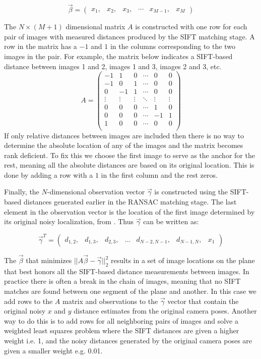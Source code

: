 \documentclass[]{spie}  %
\begin{document}
\[\vec{\beta} =
\begin{pmatrix}
  x_1, & x_2, & x_3, & \cdots & x_{M-1}, & x_M
\end{pmatrix}
\]

The $N \times (M+1)$ dimensional matrix $A$ is constructed with one
row for each pair of images with measured distances produced by the
SIFT matching stage. A row in the matrix has a $-1$ and $1$ in the
columns corresponding to the two images in the pair. For example, the
matrix below indicates a SIFT-based distance between images 1 and 2,
images 1 and 3, images 2 and 3, etc.
\[
A =
\begin{pmatrix}
  -1 & 1 & 0 & \cdots & 0 & 0\\
  -1 & 0 & 1 & \cdots & 0 & 0\\
  0 & -1 & 1 & \cdots & 0 & 0\\
  \vdots  & \vdots & \vdots & \ddots & \vdots  & \vdots\\
  0 & 0 & 0 & \cdots & 1 & 0 \\
  0 & 0 & 0 & \cdots & -1 & 1 \\
  1 & 0 & 0 & \cdots & 0 & 0 \\
\end{pmatrix}
\]
If only relative distances between images are included then there is
no way to determine the absolute location of any of the images and the
matrix becomes rank deficient. To fix this we choose the first image
to serve as the anchor for the rest, meaning all the absolute
distances are based on its original location. This is done by adding a
row with a $1$ in the first column and the rest zeros.

Finally, the $N$-dimensional observation vector $\vec{\gamma}$ is
constructed using the SIFT-based distances generated earlier in the
RANSAC matching stage. The last element in the observation vector is
the location of the first image determined by its original noisy
localization, from \cite{chen2010indoor, liu2010indoor}. Thus
$\vec{\gamma}$ can be written as:

\[
\vec{\gamma}^T =
\begin{pmatrix}
  d_{1,2}, &d_{1,3}, &d_{2,3}, &\hdots &d_{N-2,N-1}, &d_{N-1,N}, &x_1
\end{pmatrix}
\]

The $\vec{\beta}$ that minimizes $||A \vec{\beta} -
\vec{\gamma}||_2^2$ results in a set of image locations on the plane
that best honors all the SIFT-based distance measurements between
images. In practice there is often a break in the chain of images,
meaning that no SIFT matches are found between one segment of the
plane and another. In this case we add rows to the $A$ matrix and
observations to the $\vec{\gamma}$ vector that contain the original
noisy $x$ and $y$ distance estimates from the original camera
poses. Another way to do this is to add rows for all neighboring pairs
of images and solve a weighted least squares problem where the SIFT
distances are given a higher weight i.e. 1, and the noisy distances
generated by the original camera poses \cite{chen2010indoor,
  liu2010indoor} are given a smaller weight e.g. 0.01.
\end{document}
